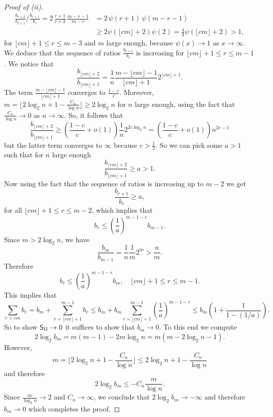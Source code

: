 \documentclass[reqno]{amsart}
\theoremstyle{theorem}
\theoremstyle{definition}
\theoremstyle{remark}
\newcommand{\1}{{\text{\Large $\mathfrak 1$}}}	%
\numberwithin{equation}{section}
\def\SSStwo{\mathsf S_{\text{\rm II}}}
\begin{document}
\begin{proof}[Proof of (ii)]
\begin{align*}
\frac{b_{r+2}}{b_{r+1}} \bigg/ \frac{b_{r+1}}{b_r} 
= 2\, \frac{r+1}{r+2}\, \frac{m-r-1}{m-r} 
&= 2\, \psi(r+1)\, \psi(m - r - 1)
\\
& \ge 2 \psi(\lfloor cm \rfloor + 2) \psi(2) =
\frac43 \psi(\lfloor cm \rfloor + 2) > 1,
\end{align*}
for $\lfloor cm \rfloor + 1 \le r \le m - 3$ and $m$ large enough,
because $\psi(x) \to 1$ as $x \to \infty$. We deduce that
the sequence of ratios $\frac{b_{r+1}}{b_r}$ is increasing for
$\lfloor cm \rfloor + 1 \le r \le m - 1$. We notice that
\[
\frac{b_{\lfloor cm \rfloor + 2}}{b_{\lfloor cm \rfloor + 1}} =
\frac1n \frac{m - \lfloor cm \rfloor - 1}{\lfloor cm \rfloor + 1}
2^{\lfloor cm \rfloor + 1}.
\]
The term $\frac{m - \lfloor cm \rfloor - 1}{\lfloor cm \rfloor + 1}$
converges to $\frac{1 - c}{c}$. 
Moreover, $m = \lfloor 2 \log_2 n + 1
- \frac{C_n}{\log n} \rfloor \ge 2 \log_2 n$ for $n$ large enough, using the
fact that $\frac{C_n}{\log n } \to 0$ as $n \to \infty$. So, it follows that
\[
\frac{b_{\lfloor cm \rfloor + 2}}{b_{\lfloor cm \rfloor + 1}} \ge
\left(\frac{1-c}{c} + o(1)\right) \frac{1}{n} 2^{2c \log_2 n} =
\left(\frac{1-c}{c} + o(1)\right) n^{2c - 1}
\]
but the latter term converges to $\infty$ because 
$c > \frac12$. So we can pick
some $a > 1$ such that for $n$ large enough
\[
\frac{b_{\lfloor cm \rfloor + 2}}{b_{\lfloor cm \rfloor + 1}} \ge a > 1.
\]
Now using the fact that the sequence of ratios is increasing up to $m-2$
we get
\[
\frac{b_{r+1}}{b_r} \ge a,
\]
for all $\lfloor cm \rfloor + 1 \le r \le m-2$, which implies that
\[
b_r \le \left(\frac{1}{a}\right)^{m - 1 - r} b_{m - 1}.
\]
Since $m > 2 \log_2 n$, we have
\[
\frac{b_m}{b_{m-1}} = \frac{1}{n} \frac{1}{m} 2^m
> \frac{n}{m}.
\]
Therefore
\[
b_r \le \left(\frac{1}{a}\right)^{m - 1 - r} b_m, \quad
\lfloor cm \rfloor + 1 \le r \le m - 1.
\]
This implies that
\[
\sum_{r > cm} b_r = b_m + \sum_{r = \lfloor cm \rfloor + 1}^{m-1} b_r
\le b_m + b_m \sum_{r = \lfloor cm \rfloor + 1}^{m-1} \left(\frac{1}{a}\right)^{m - 1 - r}
\le b_m \left(1 + \frac{1}{1 - (1/a)}\right).
\]
So to show $\SSStwo \to 0$ it suffices to show that $b_m \to 0$. 
To this end we compute
\[
2 \log_2 b_m = m ( m - 1 ) - 2 m \log_2 n = m (m - 2 \log_2 n-1).
\]
However,
\[
m = \lfloor 2 \log_2 n+1 - \frac{C_n}{\log n} \rfloor \le
2 \log_2 n+1 - \frac{C_n}{\log n}
\]
and therefore
\[
2 \log_2 b_m \le - C_n \frac{m}{\log n}.
\]
Since $\frac{m}{\log_2 n} \to 2$ and $C_n \to \infty$, we conclude that
$2 \log_2 b_m \to - \infty$ and therefore $b_m \to 0$ which completes the proof.
\end{proof}
\end{document}
